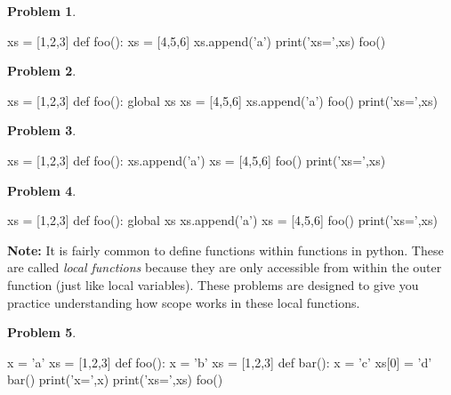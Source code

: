 \documentclass[12pt]{article}
\theoremstyle{definition}
\newtheorem{problem}{Problem}
\begin{document}
\begin{problem}
~~~
\begin{python}
xs = [1,2,3]
def foo():
    xs = [4,5,6]
    xs.append('a')
    print('xs=',xs)
foo()
\end{python}
\end{problem}
\vspace{1in}

\begin{problem}
~~~
\begin{python}
xs = [1,2,3]
def foo():
    global xs
    xs = [4,5,6]
    xs.append('a')
foo()
print('xs=',xs)
\end{python}
\end{problem}
\vspace{1in}

\newpage
\begin{problem}
~~~
\begin{python}
xs = [1,2,3]
def foo():
    xs.append('a')
    xs = [4,5,6]
foo()
print('xs=',xs)
\end{python}
\end{problem}
\vspace{1in}

\begin{problem}
~~~
\begin{python}
xs = [1,2,3]
def foo():
    global xs
    xs.append('a')
    xs = [4,5,6]
foo()
print('xs=',xs)
\end{python}
\end{problem}
\vspace{1in}

\newpage
\noindent
\textbf{Note:}
It is fairly common to define functions within functions in python.
These are called \emph{local functions} because they are only accessible from within the outer function (just like local variables).
These problems are designed to give you practice understanding how scope works in these local functions.

\begin{problem}
~~~
\begin{python}
x = 'a'
xs = [1,2,3]
def foo():
    x = 'b'
    xs = [1,2,3]
    def bar():
        x = 'c'
        xs[0] = 'd'
    bar()
    print('x=',x)
    print('xs=',xs)
foo()
\end{python}
\end{problem}
\vspace{0.75in}
\end{document}

